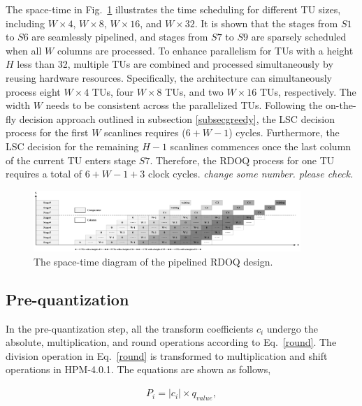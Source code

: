 \documentclass[lettersize,journal]{IEEEtran}
\begin{document}
The space-time in Fig.~\ref{timing diagram} illustrates the time scheduling for different TU sizes, including $W\times4$, $W\times8$, $W\times16$, and $W\times32$. It is shown that the stages from $S1$ to $S6$ are seamlessly pipelined, and stages from $S7$ to $S9$ are sparsely scheduled when all $W$ columns are processed. 
To enhance parallelism for TUs with a height $H$ less than 32, multiple TUs are combined and processed simultaneously by reusing hardware resources. Specifically, the architecture can simultaneously process eight $W\times4$ TUs, four $W\times8$ TUs, and two $W\times16$ TUs, respectively. The width $W$ needs to be consistent across the parallelized TUs. 
Following the on-the-fly decision approach outlined in subsection \ref{subsecgreedy}, the LSC decision process for the first $W$ scanlines requires ($6 + W - 1$) cycles. Furthermore, the LSC decision for the remaining $H-1$ scanlines commences once the last column of the current TU enters stage $S7$. Therefore, the RDOQ process for one TU requires a total of $6 + W - 1 + 3$ clock cycles. \emph{change some number. please check.}


\par
\begin{figure}[htbp]
	\centering
	\centerline{\includegraphics[width=0.90\textwidth]{pic_pan/timing diagram.png}} 
	\caption{The space-time diagram of the pipelined RDOQ design.}
	\label{timing diagram} %
\end{figure}

\subsection{Pre-quantization}
In the pre-quantization step, all the transform coefficients $c_{i}$ undergo the absolute, multiplication, and round operations according to Eq.~\eqref{round}. The division operation in Eq.~\eqref{round} is transformed to multiplication and shift operations in HPM-4.0.1. The equations are shown as follows,

\begin{equation}\label{Qp}
	\begin{aligned}
		P_{i} = \lvert c_{i} \rvert \times q_{value},
	\end{aligned}
\end{equation}
\end{document}
